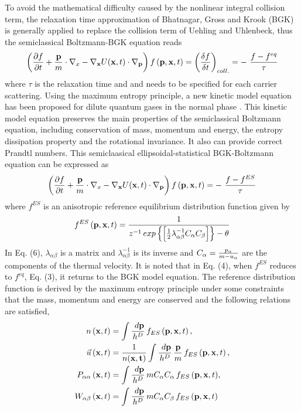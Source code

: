 \documentclass{rsproca}%
\begin{document}
To avoid the mathematical difficulty caused by the nonlinear integral collision term, the relaxation time approximation of Bhatnagar, Gross and Krook (BGK) is generally applied to replace the collision term of Uehling and Uhlenbeck, thus the semiclassical Boltzmann-BGK equation reads
\begin{equation}
\left(\frac{\partial f}{\partial t}+\frac{\bf p}{m}\cdot {\bf\nabla }_x-{\bf \nabla}_{\bf x} U({\bf x},t)\cdot {\bf\nabla }_{\bf p}\right)f\left({\bf p},{\bf x},t\right) =\left(\frac{\delta f}{\delta t}\right)_{coll.}= -\ \frac{f-f^{eq}}{\tau }
\end{equation}
where $\tau$ is the relaxation time and and needs to be specified for each carrier scattering.
Using the maximum entropy principle, a new kinetic model equation has been proposed for dilute quantum gases in the normal phase \cite{Holway1658}.  This kinetic model equation preserves the main properties of the semiclassical Boltzmann equation, including conservation of mass, momentum and energy, the entropy dissipation property and the rotational invariance.   It also can provide correct Prandtl numbers.   This semiclaasical ellipsoidal-statistical BGK-Boltzmann equation can be expressed as
\begin{equation}
\left(\frac{\partial f}{\partial t}+\frac{\bf p}{m}\cdot {\bf\nabla }_x-{\bf \nabla}_{\bf x} U({\bf x},t)\cdot {\bf\nabla }_{\bf p}\right)f\left({\bf p},{\bf x},t\right) = -\ \frac{f-f^{ES}}{\tau }
\end{equation}
where $f^{ES}$ is an anisotropic reference equilibrium distribution function given by
\begin{equation}
f^{ES}\left({\bf p},{\bf x},t\right) =\frac{1}{z^{-1}\,exp\left\{{\left[ {1\over 2} \lambda_{\alpha \beta}^{-1} C_{\alpha} C_{\beta} \right]} \right\} -\theta } 
\end{equation}
In Eq. (6), $\lambda_{\alpha \beta}$ is a matrix and $\lambda_{\alpha \beta}^{-1}$ is its inverse and $C_{\alpha} = {p_{\alpha} \over m - u_{\alpha}}$ are the components of the thermal velocity.
It is noted that in Eq. (4), when $f^{ES}$ reduces to $f^{eq}$, Eq. (3), it returns to the BGK model equation.
The reference distribution function is derived by the maximum entropy principle under some constraints that the mass, momentum and energy are conserved and the following relations are satisfied,
\begin{subequations}
\begin{align}
n\left({\bf x},t\right) &= \int{\frac{\ d{\bf p}}{h^D}}\,f_{ES} \left({\bf p},{\bf x}, t\right), \\
\vec u \left({\bf x},t\right) &= \frac{1}{n(\bf x, t)}\int{\frac{\ d{\bf p}}{h^D}\,\frac{\bf p}{m}}\,f_{ES}\left({\bf p},{\bf x}, t\right), \\
P_{\alpha \alpha} \left({\bf x},t\right) &= \int{\frac{\ d{\bf p}}{h^D}\, m C_{\alpha} C_{\alpha} \,f_{ES}\left({\bf p},{\bf x}, t\right)}, \\
W_{\alpha \beta} \left({\bf x},t\right) &= \int{\frac{\ d{\bf p}}{h^D}\,m C_{\alpha} C_{\beta} \,f_{ES} \left({\bf p},{\bf x}, t\right)} 
\end{align}
\end{subequations}
\end{document}
